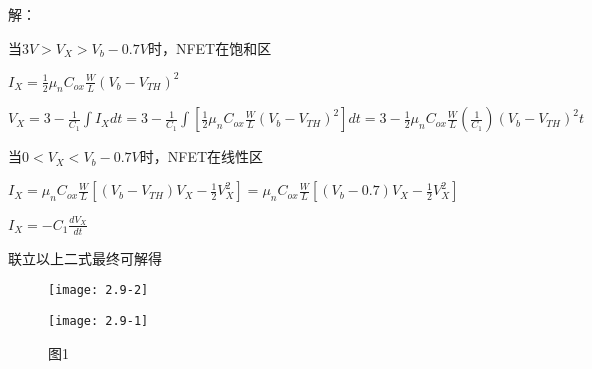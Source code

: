 

解：

\scalebox{3}{（a）}

当$3V>V_{X}>V_{b}-0.7V$时，NFET在饱和区

$I_X=\frac{1}{2}\mu_nC_{ox}\frac{W}{L}(V_{b}-V_{TH})^2$

$V_{X}=3-\frac{1}{C_1} \int I_Xdt=3-\frac{1}{C_1} \int [\frac{1}{2}\mu_nC_{ox}\frac{W}{L}(V_{b}-V_{TH})^2]dt=3-\frac{1}{2}\mu_nC_{ox}\frac{W}{L}(\frac{1}{C_1})(V_{b}-V_{TH})^2t$

当$0<V_{X}<V_{b}-0.7V$时，NFET在线性区

$I_X=\mu_nC_{ox}\frac{W}{L}[(V_{b}-V_{TH})V_{X}-\frac{1}{2}V_{X}^2]=\mu_nC_{ox}\frac{W}{L}[(V_{b}-0.7)V_{X}-\frac{1}{2}V_{X}^2]$

$I_X=-C_1\frac{dV_X}{dt}$

联立以上二式最终可解得

		\begin{figure}[H] %
	\begin{minipage}{\linewidth}
		\texttt{[image: 2.9-2]}
	\end{minipage}
\end{figure}


		\begin{figure}[H] %
	\begin{minipage}{\linewidth}
		\texttt{[image: 2.9-1]}
	\end{minipage}
	\caption*{图1} %
\end{figure}

